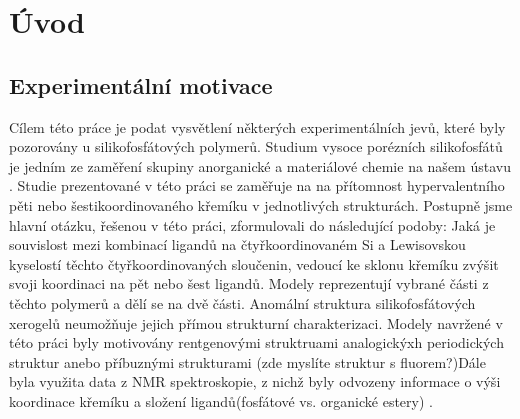 \documentclass[
  digital, %
  table,   %
  lof,     %
  lot,     %
]{fithesis3}
\begin{document}
\chapter{Úvod}

\section{Experimentální motivace}
Cílem této práce je podat vysvětlení některých experimentálních jevů, které byly pozorovány u silikofosfátových polymerů. Studium vysoce porézních silikofosfátů je jedním ze zaměření skupiny anorganické a materiálové chemie na našem ústavu .
Studie prezentované v této práci se zaměřuje na na přítomnost hypervalentního pěti nebo šestikoordinovaného křemíku v jednotlivých strukturách. Postupně jsme hlavní otázku, řešenou v této práci, zformulovali do následující podoby: Jaká je souvislost mezi kombinací ligandů na čtyřkoordinovaném Si a Lewisovskou kyselostí těchto čtyřkoordinovaných sloučenin, vedoucí ke sklonu křemíku zvýšit svoji koordinaci na pět nebo šest ligandů. Modely reprezentují vybrané části z těchto polymerů a dělí se na dvě části. Anomální struktura silikofosfátových xerogelů neumožňuje jejich přímou strukturní charakterizaci. Modely navržené v této práci byly motivovány rentgenovými struktruami analogickýxh periodických struktur \cite{C3NJ00721A} anebo příbuznými strukturami \cite{Chipanina2011}(zde myslíte struktur s fluorem?)Dále byla využita data z NMR spektroskopie, z nichž byly odvozeny informace o výši koordinace křemíku a složení ligandů(fosfátové vs. organické estery) \cite{Styskalik2015thesis}.
\end{document}
